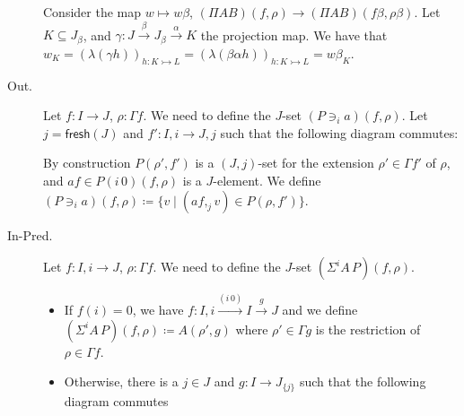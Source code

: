 \documentclass[english]{PaperTools/latex/lipics}
\newcommand\op[1]{∋_{#1}}
\newcommand\ip[3]{Σ^{#1} {#2}\,{#3}}
\def\fresh#1{\mathsf{fresh}(#1)}
\def\ie{\textit{i.e.}}
\begin{document}
\begin{description}
    Consider the map $w ↦ wβ$, $(Π A B)(f,ρ) → (Π A B)(fβ,ρβ)$.  Let
    $K ⊆ J_β$, and $γ : J \stackrel{β}{→} J_β \stackrel{α}{→} K$ the projection map.
    We have that
    $w_K = \left(λ(γh)\right)_{h : K ↣ L}
         = \left(λ(βαh)\right)_{h : K ↣ L}
         = wβ_K$.


  \item[\sc Out.]
    Let $f : I → J$, $ρ : Γf$.  We need to define the $J$-set $(P \op {i} a)(f,ρ)$.
    Let $j = \fresh J$ and $f' : I,i → J,j$ such that the following
    diagram commutes:


    By construction $P(ρ',f')$ is a $(J,j)$-set for the extension $ρ' ∈ Γf'$ of $ρ$,
    and $af ∈ P(i\,0)(f,ρ)$ is a $J$-element.
    We define $(P \op {i} a)(f,ρ) ≔ \{ v \mid (af ,_j v) ∈ P(ρ,f')\}$.

  \item[\sc In-Pred.]
    Let $f : I,i → J$, $ρ : Γf$.  We need to define the $J$-set $(\ip {i} A P)(f,ρ)$.

    \begin{itemize}
      \item If $f(i) = 0$, we have $f : I,i \stackrel{(i\,0)}{→} I \stackrel{g}{→} J$
        and we define $(\ip {i} A P)(f,ρ) ≔ A(ρ',g)$
        where $ρ' ∈ Γg$ is the restriction of $ρ ∈ Γf$.

      \item Otherwise, there is a $j ∈ J$ and $g : I → J_{\{j\}}$ such that
        the following diagram commutes


\end{itemize}
\end{description}
\end{document}
